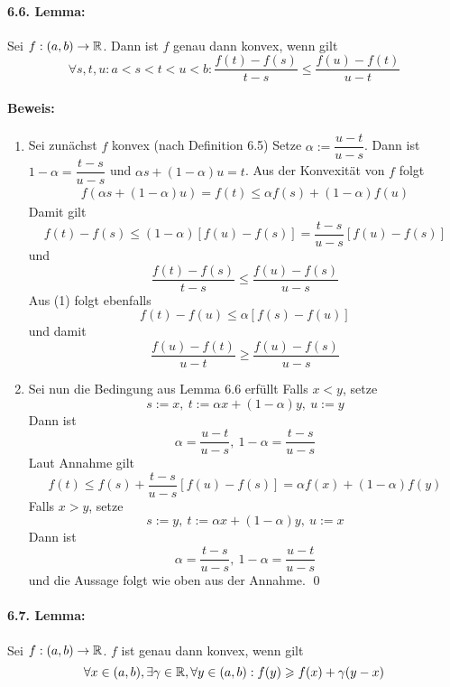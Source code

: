 \documentclass[12pt]{report}
\begin{document}
 \paragraph{6.6. Lemma:}Sei $f:(a,b)\to\mathbb{R}$. Dann ist $f$ genau dann konvex, wenn gilt
 $$\forall s,t,u:a<s<t<u<b:\dfrac{f(t)-f(s)}{t-s}\leq\dfrac{f(u)-f(t)}{u-t}$$
 
 \paragraph{Beweis:}
 \begin{enumerate}[label=\Roman*.]
     \item Sei zun\"achst $f$ konvex (nach Definition 6.5)\newline
     Setze $\alpha:=\dfrac{u-t}{u-s}$. Dann ist $1-\alpha=\dfrac{t-s}{u-s}$ und $\alpha s+(1-\alpha)u=t$. Aus der Konvexit\"at von $f$ folgt
     \begin{gather}
         f(\alpha s+(1-\alpha)u)=f(t)\leq\alpha f(s)+(1-\alpha)f(u)
     \end{gather}
     Damit gilt
     $$f(t)-f(s)\leq(1-\alpha)[f(u)-f(s)]=\dfrac{t-s}{u-s}[f(u)-f(s)]$$
     und
     $$\dfrac{f(t)-f(s)}{t-s}\leq\dfrac{f(u)-f(s)}{u-s}$$
     Aus (1) folgt ebenfalls
     $$f(t)-f(u)\leq\alpha[f(s)-f(u)]$$
     und damit 
     $$\dfrac{f(u)-f(t)}{u-t}\geq\dfrac{f(u)-f(s)}{u-s}$$
     \item Sei nun die Bedingung aus Lemma 6.6 erf\"ullt\newline
     Falls $x<y$, setze 
     $$s:=x,\ t:=\alpha x+(1-\alpha)y,\ u:= y$$ 
     Dann ist
     $$\alpha = \dfrac{u-t}{u-s},\ 1-\alpha=\dfrac{t-s}{u-s}$$
     Laut Annahme gilt
     $$f(t)\leq f(s)+\dfrac{t-s}{u-s}[f(u)-f(s)]=\alpha f(x)+(1-\alpha)f(y)$$
     Falls $x>y$, setze
     $$s:=y,\ t:=\alpha x+(1-\alpha)y,\ u:=x$$
     Dann ist
     $$\alpha=\dfrac{t-s}{u-s},\ 1-\alpha=\dfrac{u-t}{u-s}$$
     und die Aussage folgt wie oben aus der Annahme. \qed
 \end{enumerate}
 
 \paragraph{6.7. Lemma:}Sei $f:(a,b)\to\mathbb{R}$. $f$ ist genau dann konvex, wenn gilt
 $$\forall x\in(a,b),\exists\gamma\in\mathbb{R},\forall y\in(a,b):f(y)\geqslant f(x)+\gamma(y-x)$$
 
\end{document}
